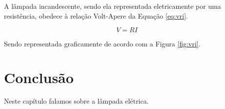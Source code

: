 A lâmpada incandescente, sendo ela representada eletricamente por
uma resistência, obedece à relação Volt-Apere da Equação \ref{eq:vri}.

\begin{equation}
\label{eq:vri}
V=R I
\end{equation}

Sendo representada graficamente de acordo com a Figura \ref{fig:vri}.


\section{Conclusão}

Neste capítulo falamos sobre a lâmpada elétrica.
